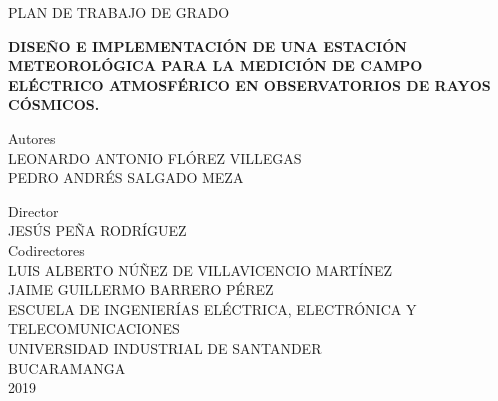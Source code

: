 \documentclass[12pt,a4paper,oneside]{book}
\title{}
\begin{document}
\begin{center}
\thispagestyle{empty}
\fontsize{11pt}{11pt}\selectfont 

PLAN DE TRABAJO DE GRADO 

\vspace{3cm}

\textbf { DISEÑO E IMPLEMENTACIÓN DE UNA ESTACIÓN METEOROLÓGICA PARA LA MEDICIÓN DE CAMPO ELÉCTRICO ATMOSFÉRICO EN OBSERVATORIOS DE RAYOS CÓSMICOS.}


\vspace{3cm}

{ Autores}
\\
{ LEONARDO ANTONIO FLÓREZ VILLEGAS \\
PEDRO ANDRÉS SALGADO MEZA}

\vspace{2cm}
{ Director}
\\
{ JESÚS PEÑA RODRÍGUEZ}\\
\vspace{2cm}
{ Codirectores}\\
{ LUIS ALBERTO NÚÑEZ DE VILLAVICENCIO MARTÍNEZ} \\
{ JAIME GUILLERMO BARRERO PÉREZ } \\
\vspace{2cm}
{ ESCUELA DE INGENIERÍAS ELÉCTRICA, ELECTRÓNICA Y TELECOMUNICACIONES
}\\
{ UNIVERSIDAD INDUSTRIAL DE SANTANDER}\\
{ BUCARAMANGA}\\
{ 2019}

  \end{center}
\large
\end{document}

